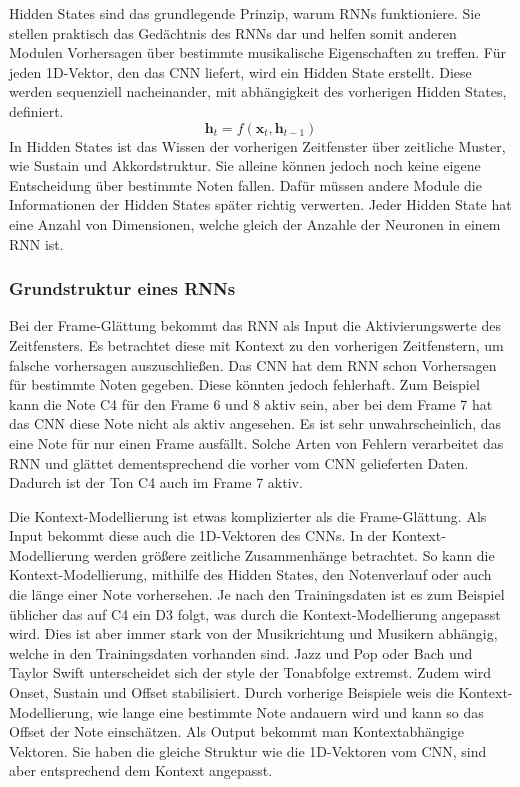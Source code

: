 \begin{description}[style=nextline]
\item[Hidden States]\label{itm:hidden}
Hidden States sind das grundlegende Prinzip, warum RNNs funktioniere.
Sie stellen praktisch das Gedächtnis des RNNs dar und helfen somit
anderen Modulen Vorhersagen über bestimmte musikalische Eigenschaften zu treffen.
Für jeden 1D-Vektor, den das CNN liefert, wird ein Hidden State erstellt.
Diese werden sequenziell nacheinander, mit abhängigkeit des vorherigen Hidden States, definiert.
\[
\mathbf{h}_t = f(\mathbf{x}_t, \mathbf{h}_{t-1})
\]
In Hidden States ist das Wissen der vorherigen Zeitfenster über zeitliche Muster, wie Sustain und Akkordstruktur.
Sie alleine können jedoch noch keine eigene Entscheidung über bestimmte Noten fallen.
Dafür müssen andere Module die Informationen der Hidden States später richtig verwerten.
Jeder Hidden State hat eine Anzahl von Dimensionen, welche gleich der Anzahle der Neuronen in einem RNN ist.
\end{description}

\subsubsection{Grundstruktur eines RNNs}
Bei der Frame-Glättung bekommt das RNN als Input die Aktivierungswerte des Zeitfensters.
Es betrachtet diese mit Kontext zu den vorherigen Zeitfenstern, um falsche vorhersagen auszuschließen.
Das CNN hat dem RNN schon Vorhersagen für bestimmte Noten gegeben.
Diese könnten jedoch fehlerhaft.
Zum Beispiel kann die Note C4 für den Frame 6 und 8 aktiv sein,
aber bei dem Frame 7 hat das CNN diese Note nicht als aktiv angesehen.
Es ist sehr unwahrscheinlich, das eine Note für nur einen Frame ausfällt.
Solche Arten von Fehlern verarbeitet das RNN und glättet dementsprechend die vorher vom CNN gelieferten Daten.
Dadurch ist der Ton C4 auch im Frame 7 aktiv.

Die Kontext-Modellierung ist etwas komplizierter als die Frame-Glättung.
Als Input bekommt diese auch die 1D-Vektoren des CNNs.
In der Kontext-Modellierung werden größere zeitliche Zusammenhänge betrachtet.
So kann die Kontext-Modellierung, mithilfe des Hidden States,
den Notenverlauf oder auch die länge einer Note vorhersehen.
Je nach den Trainingsdaten ist es zum Beispiel üblicher das auf C4 ein D3 folgt,
was durch die Kontext-Modellierung angepasst wird.
Dies ist aber immer stark von der Musikrichtung und Musikern abhängig, welche in den Trainingsdaten vorhanden sind.
Jazz und Pop oder Bach und Taylor Swift unterscheidet sich der style der Tonabfolge extremst.
Zudem wird Onset, Sustain und Offset stabilisiert.
Durch vorherige Beispiele weis die Kontext-Modellierung,
wie lange eine bestimmte Note andauern wird und kann so das Offset der Note einschätzen.
Als Output bekommt man Kontextabhängige Vektoren.
Sie haben die gleiche Struktur wie die 1D-Vektoren vom CNN, sind aber entsprechend dem Kontext angepasst.

